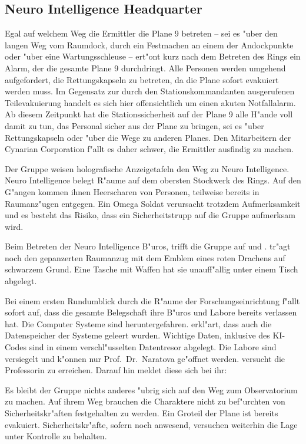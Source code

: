 \subsection{Neuro Intelligence Headquarter}
Egal auf welchem Weg die Ermittler die Plane 9 betreten -- sei es "uber den langen Weg vom Raumdock, durch ein Festmachen an einem der Andockpunkte oder "uber eine Wartungsschleuse -- ert"ont kurz nach dem Betreten des Rings ein Alarm, der die gesamte Plane 9 durchdringt. Alle Personen werden umgehend aufgefordert, die Rettungskapseln zu betreten, da die Plane sofort evakuiert werden muss. Im Gegensatz zur durch den Stationskommandanten ausgerufenen Teilevakuierung handelt es sich hier offensichtlich um einen akuten Notfallalarm. Ab diesem Zeitpunkt hat die Stationssicherheit auf der Plane 9 alle H"ande voll damit zu tun, das Personal sicher aus der Plane zu bringen, sei es "uber Rettungskapseln oder "uber die Wege zu anderen Planes. Den Mitarbeitern der Cynarian Corporation f"allt es daher schwer, die Ermittler ausfindig zu machen.

Der Gruppe weisen holografische Anzeigetafeln den Weg zu Neuro Intelligence. Neuro Intelligence belegt R"aume auf dem obersten Stockwerk des Rings. Auf den G"angen kommen ihnen Heerscharen von Personen, teilweise bereits in Raumanz"ugen entgegen. Ein Omega Soldat verursacht trotzdem Aufmerksamkeit und es besteht das Risiko, dass ein Sicherheitstrupp auf die Gruppe aufmerksam wird.

Beim Betreten der Neuro Intelligence B"uros, trifft die Gruppe auf \xl{} und \ml{}. \xl{} tr"agt noch den gepanzerten Raumanzug mit dem Emblem eines roten Drachens auf schwarzem Grund. Eine Tasche mit Waffen hat sie unauff"allig unter einem Tisch abgelegt. 

Bei einem ersten Rundumblick durch die R"aume der Forschungseinrichtung f"allt sofort auf, dass die gesamte Belegschaft ihre B"uros und Labore bereits verlassen hat. Die Computer Systeme sind heruntergefahren. \ml{} erkl"art, dass auch die Datenspeicher der Systeme geleert wurden. Wichtige Daten, inklusive des KI-Codes sind in einem verschl"usselten Datentresor abgelegt. Die Labore sind versiegelt und k"onnen nur Prof.~Dr.~Naratova ge"offnet werden. \ml{} versucht die Professorin zu erreichen. Darauf hin meldet diese sich bei ihr:


Es bleibt der Gruppe nichts anderes "ubrig sich auf den Weg zum Observatorium zu machen. Auf ihrem Weg brauchen die Charaktere nicht zu bef"urchten von Sicherheitskr"aften festgehalten zu werden. Ein Gro\3teil der Plane ist bereits evakuiert. Sicherheitskr"afte, sofern noch anwesend, versuchen weiterhin die Lage unter Kontrolle zu behalten.

